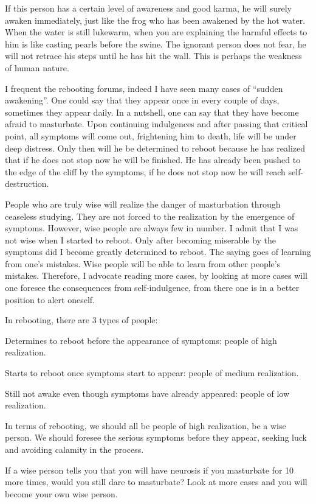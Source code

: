 \documentclass[
]{book}
\begin{document}
If this person has a certain level of awareness and good karma, he will surely awaken immediately, just like the frog who has been awakened by the hot water. When the water is still lukewarm, when you are explaining the harmful effects to him is like casting pearls before the swine. The ignorant person does not fear, he will not retrace his steps until he has hit the wall. This is perhaps the weakness of human nature.

I frequent the rebooting forums, indeed I have seen many cases of ``sudden awakening''. One could say that they appear once in every couple of days, sometimes they appear daily. In a nutshell, one can say that they have become afraid to masturbate. Upon continuing indulgences and after passing that critical point, all symptoms will come out, frightening him to death, life will be under deep distress. Only then will he be determined to reboot because he has realized that if he does not stop now he will be finished. He has already been pushed to the edge of the cliff by the symptoms, if he does not stop now he will reach self-destruction.

People who are truly wise will realize the danger of masturbation through ceaseless studying. They are not forced to the realization by the emergence of symptoms. However, wise people are always few in number. I admit that I was not wise when I started to reboot. Only after becoming miserable by the symptoms did I become greatly determined to reboot. The saying goes of learning from one's mistakes. Wise people will be able to learn from other people's mistakes. Therefore, I advocate reading more cases, by looking at more cases will one foresee the consequences from self-indulgence, from there one is in a better position to alert oneself.

In rebooting, there are 3 types of people:

Determines to reboot before the appearance of symptoms: people of high realization.

Starts to reboot once symptoms start to appear: people of medium realization.

Still not awake even though symptoms have already appeared: people of low realization.

In terms of rebooting, we should all be people of high realization, be a wise person. We should foresee the serious symptoms before they appear, seeking luck and avoiding calamity in the process.

If a wise person tells you that you will have neurosis if you masturbate for 10 more times, would you still dare to masturbate? Look at more cases and you will become your own wise person.
\end{document}
